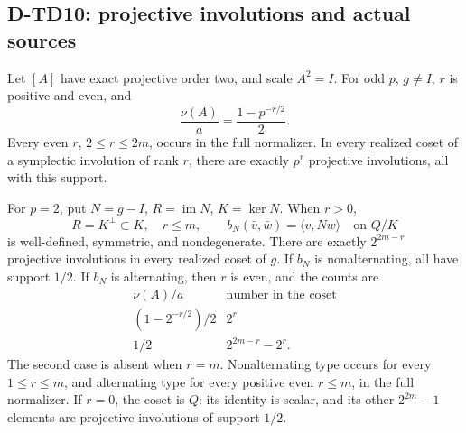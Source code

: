 \subsection{D-TD10: projective involutions and actual sources}

\begin{theorem}[D-TD10]
Let \([A]\) have exact projective order two, and scale \(A^2=I\).
For odd \(p\), \(g\ne I\), \(r\) is positive and even, and
\[
                         \frac{\nu(A)}a=\frac{1-p^{-r/2}}2.
 \tag{TDS.14}
\]
Every even \(r\), \(2\le r\le2m\), occurs in the full normalizer.
In every realized coset of a symplectic involution of rank \(r\),
there are exactly \(p^r\) projective involutions, all with this support.

For \(p=2\), put \(N=g-I\), \(R=\operatorname{im}N\), \(K=\ker N\).
When \(r>0\),
\[
 R=K^\perp\subset K,\quad r\le m,\qquad
 b_N(\bar v,\bar w)=\langle v,Nw\rangle\quad\text{on }Q/K
 \tag{TDS.15}
\]
is well-defined, symmetric, and nondegenerate.
There are exactly \(2^{2m-r}\) projective involutions in every
realized coset of \(g\).
If \(b_N\) is nonalternating, all have support \(1/2\).
If \(b_N\) is alternating, then \(r\) is even, and the counts are
\[
 \begin{array}{c|c}
 \nu(A)/a&\text{number in the coset}\\ \hline
 (1-2^{-r/2})/2&2^r\\
 1/2&2^{2m-r}-2^r .
 \end{array}
 \tag{TDS.16}
\]
The second case is absent when \(r=m\).
Nonalternating type occurs for every \(1\le r\le m\), and
alternating type for every positive even \(r\le m\), in the full
normalizer.  If \(r=0\), the coset is \(Q\): its identity is scalar,
and its other \(2^{2m}-1\) elements are projective involutions of
support \(1/2\).
\end{theorem}

